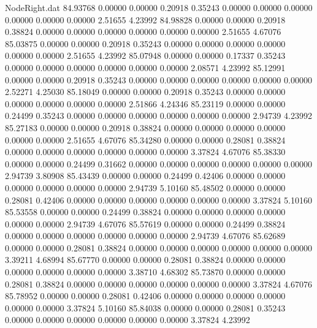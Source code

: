 \begin{filecontents}{NodeRight.dat}
  84.93768    0.00000    0.00000     0.20918    0.35243    0.00000    0.00000    0.00000    0.00000    0.00000    0.00000    2.51655    4.23992
  84.98828    0.00000    0.00000     0.20918    0.38824    0.00000    0.00000    0.00000    0.00000    0.00000    0.00000    2.51655    4.67076
  85.03875    0.00000    0.00000     0.20918    0.35243    0.00000    0.00000    0.00000    0.00000    0.00000    0.00000    2.51655    4.23992
  85.07948    0.00000    0.00000     0.17337    0.35243    0.00000    0.00000    0.00000    0.00000    0.00000    0.00000    2.08571    4.23992
  85.12991    0.00000    0.00000     0.20918    0.35243    0.00000    0.00000    0.00000    0.00000    0.00000    0.00000    2.52271    4.25030
  85.18049    0.00000    0.00000     0.20918    0.35243    0.00000    0.00000    0.00000    0.00000    0.00000    0.00000    2.51866    4.24346
  85.23119    0.00000    0.00000     0.24499    0.35243    0.00000    0.00000    0.00000    0.00000    0.00000    0.00000    2.94739    4.23992
  85.27183    0.00000    0.00000     0.20918    0.38824    0.00000    0.00000    0.00000    0.00000    0.00000    0.00000    2.51655    4.67076
  85.34280    0.00000    0.00000     0.28081    0.38824    0.00000    0.00000    0.00000    0.00000    0.00000    0.00000    3.37824    4.67076
  85.38330    0.00000    0.00000     0.24499    0.31662    0.00000    0.00000    0.00000    0.00000    0.00000    0.00000    2.94739    3.80908
  85.43439    0.00000    0.00000     0.24499    0.42406    0.00000    0.00000    0.00000    0.00000    0.00000    0.00000    2.94739    5.10160
  85.48502    0.00000    0.00000     0.28081    0.42406    0.00000    0.00000    0.00000    0.00000    0.00000    0.00000    3.37824    5.10160
  85.53558    0.00000    0.00000     0.24499    0.38824    0.00000    0.00000    0.00000    0.00000    0.00000    0.00000    2.94739    4.67076
  85.57619    0.00000    0.00000     0.24499    0.38824    0.00000    0.00000    0.00000    0.00000    0.00000    0.00000    2.94739    4.67076
  85.62689    0.00000    0.00000     0.28081    0.38824    0.00000    0.00000    0.00000    0.00000    0.00000    0.00000    3.39211    4.68994
  85.67770    0.00000    0.00000     0.28081    0.38824    0.00000    0.00000    0.00000    0.00000    0.00000    0.00000    3.38710    4.68302
  85.73870    0.00000    0.00000     0.28081    0.38824    0.00000    0.00000    0.00000    0.00000    0.00000    0.00000    3.37824    4.67076
  85.78952    0.00000    0.00000     0.28081    0.42406    0.00000    0.00000    0.00000    0.00000    0.00000    0.00000    3.37824    5.10160
  85.84038    0.00000    0.00000     0.28081    0.35243    0.00000    0.00000    0.00000    0.00000    0.00000    0.00000    3.37824    4.23992

\end{filecontents}
